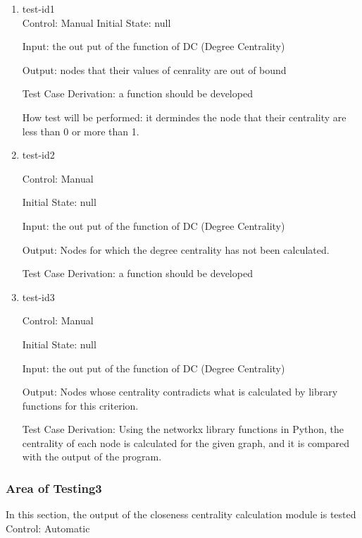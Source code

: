 \documentclass[12pt, titlepage]{article}
\begin{document}
\begin{enumerate}

\item{test-id1\\}	
Control: Manual				
Initial State: null
					
Input: the out put of the function of DC (Degree Centrality)
					
Output: nodes that their values of cenrality are out of bound

Test Case Derivation: a function should be developed 

How test will be performed: it dermindes the node that their centrality are less than 0 or more than 1.
\item{test-id2\\}

Control: Manual
					
Initial State: null
					
Input: the out put of the function of DC (Degree Centrality)
					
Output: Nodes for which the degree centrality has not been calculated.

Test Case Derivation: a function should be developed 

\item{test-id3\\}

Control: Manual
					
Initial State: null
					
Input: the out put of the function of DC (Degree Centrality)
					
Output: Nodes whose centrality contradicts what is calculated by library functions for this criterion.

Test Case Derivation: Using the networkx library functions in Python, the centrality of each node is calculated for the given graph, and it is compared with the output of the program.


\end{enumerate}
\subsubsection{Area of Testing3}

In this section, the output of the closeness centrality calculation module is tested
Control: Automatic
\end{document}
